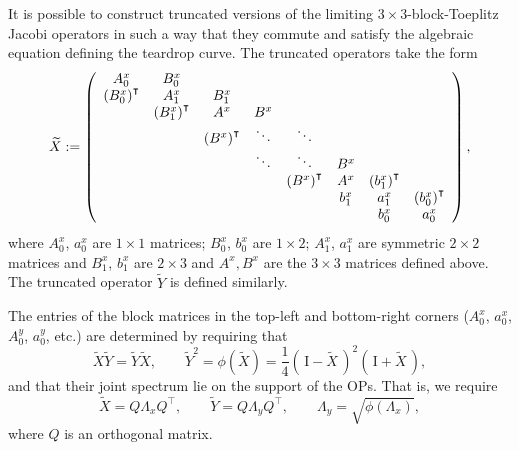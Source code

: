 \documentclass[12pt,a4paper]{article}
\begin{document}
It is possible to construct truncated versions of the limiting $3\times 3$-block-Toeplitz Jacobi operators in such a way that they commute and satisfy the algebraic equation defining the teardrop curve. The truncated operators take the form
\begin{equation}
\widetilde{X} := \left(
\begin{array}{c c c c c c c c }
A_0^x  & B_0^x   &        &        & & & &   \\
\left(B_0^x \right)^{\intercal} & A_1^x  & B_1^x &       & &  & &      \\
                                &\left(B_1^x \right)^{\intercal} & A^x  &  B^x       &  &    & &     \\
                                            & & \left(B^x \right)^{\intercal}  &  \ddots        & \ddots  &  & &       \\
                                                        & &    &   \ddots      & \ddots  &B^x   & &       \\
             & &   &          & \left(B^x \right)^{\intercal}  &      A^x    & \left(b_1^x \right)^{\intercal} &  \\
                                &                        & &          &  & b_1^x   & a_1^x & \left(b_0^x \right)^{\intercal}  \\
                                &     & & & &  &  b_0^x & a_0^x
\end{array}
\right), \label{eq:xtruncation}
\end{equation}
where $A_0^x$, $a_0^x$ are $1\times 1$ matrices; $B_0^x$, $b_0^x$ are $1 \times 2$; $A_1^x$, $a_1^x$ are symmetric $2 \times 2$ matrices and $B_1^x$, $b_1^x$ are $2 \times 3$ and $A^x, B^x$ are the $3\times 3$ matrices defined above. The truncated operator $\widetilde{Y}$ is defined similarly. 

The entries of the block matrices in the top-left and bottom-right corners ($A_0^x$, $a_0^x$, $A_0^y$, $a_0^y$, etc.) are determined by requiring that
\begin{equation}
\widetilde{X}\widetilde{Y} = \widetilde{Y}\widetilde{X}, \qquad \widetilde{Y}^2 = \phi( \widetilde{X} ) =  \frac{1}{4}\left(\,\mathrm{I} - \widetilde{X} \,\right)^2 \left(\,\mathrm{I} + \widetilde{X} \,\right), \label{eq:opalgebra}
\end{equation}
and that their joint spectrum lie on the support of the OPs. That is, we require 
\begin{equation}
\widetilde{X} = Q\Lambda_xQ^{\intercal}, \qquad 
\widetilde{Y} = Q\Lambda_yQ^{\intercal}, \qquad
\Lambda_y = \sqrt{\phi(\Lambda_x)}, \label{eq:opspectrum}
\end{equation}
where $Q$ is an orthogonal matrix.
\end{document}
